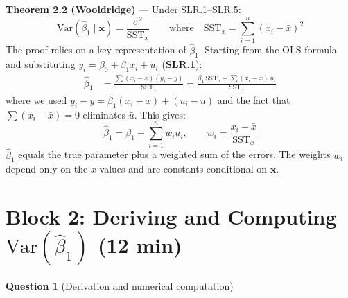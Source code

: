 \documentclass[11pt,a4paper]{article}
\begin{document}
\begin{bookexample}
\textbf{\color{blockcolor}Theorem 2.2 (Wooldridge)} --- Under SLR.1--SLR.5:
\[
  \boxed{\text{Var}(\hat{\beta}_1 \mid \mathbf{x}) = \frac{\sigma^2}{\text{SST}_x}}
  \qquad\text{where}\quad
  \text{SST}_x = \sum_{i=1}^{n}(x_i - \bar{x})^2
\]
The proof relies on a key representation of $\hat{\beta}_1$. Starting from the OLS formula and substituting $y_i = \beta_0 + \beta_1 x_i + u_i$ (\textbf{SLR.1}):
\begin{align*}
  \hat{\beta}_1
  &= \frac{\sum(x_i - \bar{x})(y_i - \bar{y})}{\text{SST}_x}
  = \frac{\beta_1\,\text{SST}_x + \sum(x_i - \bar{x})\,u_i}{\text{SST}_x}
\end{align*}
where we used $y_i - \bar{y} = \beta_1(x_i - \bar{x}) + (u_i - \bar{u})$ and the fact that $\sum(x_i - \bar{x}) = 0$ eliminates $\bar{u}$. This gives:
\[
  \boxed{\hat{\beta}_1 = \beta_1 + \sum_{i=1}^{n} w_i u_i,
  \qquad w_i = \frac{x_i - \bar{x}}{\text{SST}_x}}
\]
$\hat{\beta}_1$ equals the true parameter plus a weighted sum of the errors. The weights $w_i$ depend only on the $x$-values and are constants conditional on $\mathbf{x}$.
\end{bookexample}

\section{Block 2: Deriving and Computing $\text{Var}(\hat{\beta}_1)$ \textnormal{(12 min)}}

\textbf{Question 1} (Derivation and numerical computation)
\end{document}

